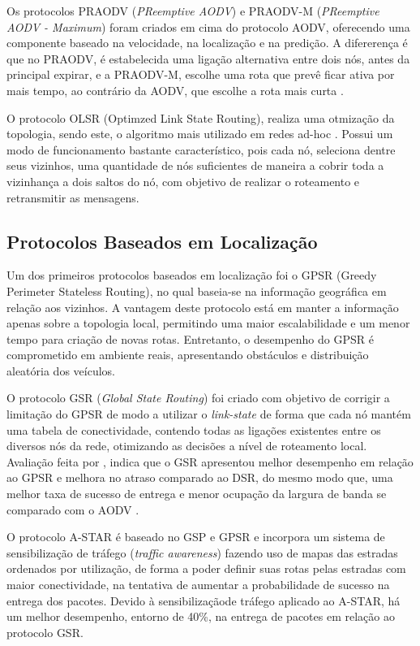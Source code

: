 \documentclass[
	12pt,				%
	oneside,			%
	a4paper,			%
	english,			%
	brazil				%
	]{abntex2ppgsi}
\begin{document}
Os protocolos PRAODV (\textit{PReemptive AODV}) e PRAODV-M (\textit{PReemptive AODV - Maximum}) foram criados em cima do protocolo AODV, oferecendo uma componente baseado na velocidade, na localização  e na predição. A difererença é que no PRAODV, é estabelecida uma ligação alternativa entre dois nós, antes da principal expirar, e a PRAODV-M, escolhe uma rota que prevê ficar ativa por mais tempo, ao contrário da AODV, que escolhe a rota mais curta \cite{luis2009melhoria}. 

O protocolo OLSR (Optimzed Link State Routing), realiza uma otmização da topologia, sendo este, o algoritmo mais utilizado em redes ad-hoc \cite{jacquet2001optimized}. Possui um modo de funcionamento bastante característico, pois cada nó, seleciona dentre seus vizinhos, uma quantidade de nós suficientes de maneira a cobrir toda a vizinhança a dois saltos do nó, com objetivo de realizar o roteamento e retransmitir as mensagens. 

\subsection{Protocolos Baseados em Localização}

Um dos primeiros protocolos baseados em localização foi o GPSR (Greedy Perimeter Stateless Routing), no qual baseia-se na informação geográfica em relação aos vizinhos. A vantagem deste protocolo está em manter a informação apenas sobre a topologia local, permitindo uma maior escalabilidade e um menor tempo para criação de novas rotas. Entretanto, o desempenho do GPSR é comprometido em ambiente reais, apresentando obstáculos e distribuição aleatória dos veículos.

O protocolo GSR (\textit{Global State Routing}) foi criado com objetivo de corrigir a limitação do GPSR de modo a utilizar o \textit{link-state} de forma que cada nó mantém uma tabela de conectividade, contendo todas as ligações existentes entre os diversos nós da rede, otimizando as decisões a nível de roteamento local. Avaliação feita por  , indica que o GSR apresentou melhor desempenho em relação ao GPSR e melhora no atraso comparado ao DSR, do mesmo modo que, uma melhor taxa de sucesso de entrega e menor ocupação da largura de banda se comparado com o AODV \cite{li2007routing}.  

O protocolo A-STAR é baseado no GSP e GPSR e incorpora um sistema de sensibilização de tráfego (\textit{traffic awareness}) fazendo uso de mapas das estradas ordenados por utilização, de forma a poder definir suas rotas pelas estradas com maior conectividade, na tentativa de aumentar a probabilidade de sucesso na entrega dos pacotes. Devido à sensibilizaçãode tráfego aplicado ao A-STAR, há um melhor desempenho, entorno de 40\%, na entrega de pacotes em relação ao protocolo GSR.
\end{document}
